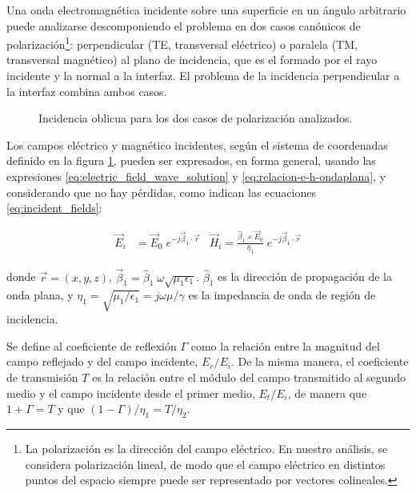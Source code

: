 Una onda electromagnética incidente sobre una superficie en un ángulo arbitrario puede analizarse descomponiendo el problema en dos casos canónicos de polarización\footnote{La polarización es la dirección del campo eléctrico. En nuestro análisis, se considera polarización lineal, de modo que el campo eléctrico en distintos puntos del espacio siempre puede ser representado por vectores colineales.}: perpendicular (TE, transversal eléctrico) o paralela (TM, transversal magnético) al plano de incidencia, que es el formado por el rayo incidente y la normal a la interfaz. El problema de la incidencia perpendicular a la interfaz combina ambos casos.

\begin{figure} [H]
	\centering 
	\hspace{5mm}
	\caption{Incidencia oblicua para los dos casos de polarización analizados.}
	\label{fig:oblique_incidence}
\end{figure}

Los campos eléctrico y magnético incidentes, según el sistema de coordenadas definido en la figura \ref{fig:oblique_incidence}, pueden ser expresados, en forma general, usando las expresiones \ref{eq:electric_field_wave_solution} y \ref{eq:relacion-e-h-ondaplana}, y considerando que no hay pérdidas, como indican las ecuaciones \ref{eq:incident_fields}:

\begin{align}
	\label{eq:incident_fields}
	\vec{E}_i &= \vec{E}_0 \;e^{-j\vec{\beta}_1 \cdot \vec{r}} &
	\vec{H}_i = \frac{\hat{\beta}_1 \times \vec{E}_0}{\eta_1} \;e^{-j\vec{\beta}_1 \cdot \vec{r}}
\end{align}

donde $\vec{r}=(x,y,z)$, $\vec{\beta}_1 = \hat{\beta}_1 \;\omega \sqrt{\mu_1 \epsilon_1}$. $\hat{\beta}_1$ es la dirección de propagación de la onda plana, y $\eta_1 = \sqrt{\mu_1 / \epsilon_1} = j\omega \mu / \gamma$ es la impedancia de onda de región de incidencia.

Se define al coeficiente de reflexión $\Gamma$ como la relación entre la magnitud del campo reflejado y del campo incidente, $E_r / E_i$. De la misma manera, el coeficiente de transmisión $T$ es la relación entre el módulo del campo transmitido al segundo medio y el campo incidente desde el primer medio, $E_t / E_i$, de manera que $1+\Gamma = T$ y que $(1-\Gamma)/\eta_1 = T/\eta_2$. 

